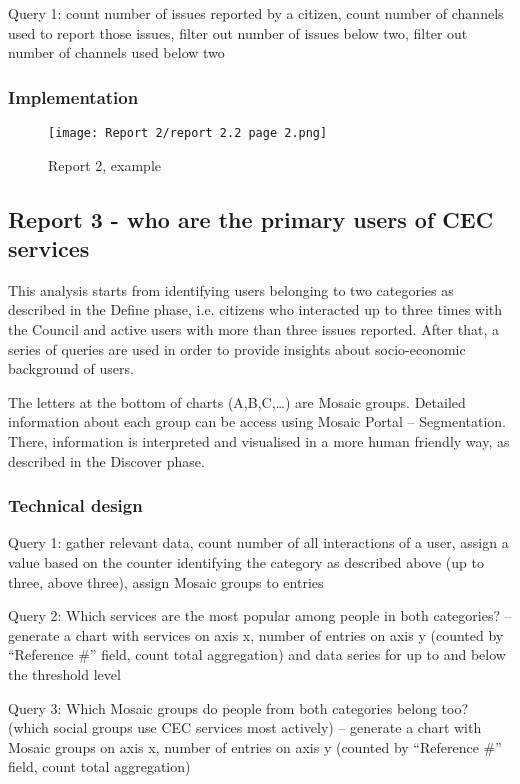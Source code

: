 Query 1: count number of issues reported by a citizen, count number of channels used to report those issues, filter out number of issues below two, filter out number of channels used below two
			
			\subsubsection{Implementation}

\begin{figure}[hp]
\centering
     \texttt{[image: Report 2/report 2.2 page 2.png]}
      \caption{Report 2, example}
       \label{normal_case}
\end{figure}
			
		\subsection{Report 3 - who are the primary users of CEC services}
		
This analysis starts from identifying users belonging to two categories as described in the Define phase, i.e. citizens who interacted up to three times with the Council and active users with more than three issues reported. After that, a series of queries are used in order to provide insights about socio-economic background of users.

The letters at the bottom of charts (A,B,C,…) are Mosaic groups. Detailed information about each group can be access using Mosaic Portal – Segmentation. There, information is interpreted and visualised in a more human friendly way, as described in the Discover phase.

			\subsubsection{Technical design}
			
Query 1: gather relevant data, count number of all interactions of a user, assign a value based on the counter identifying the category as described above (up to three, above three), assign Mosaic groups to entries

Query 2: Which services are the most popular among people in both categories? – generate a chart with services on axis x, number of entries on axis y (counted by “Reference \#” field, count total aggregation) and data series for up to and below the threshold level

Query 3: Which Mosaic groups do people from both categories belong too? (which social groups use CEC services most actively) – generate a chart with Mosaic groups on axis x, number of entries on axis y (counted by “Reference \#” field, count total aggregation)

